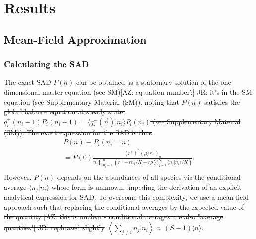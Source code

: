 \documentclass[9pt,twocolumn,twoside,lineno]{pnas-new}
\begin{document}
\section{Results}

\subsection{Mean-Field Approximation}
\subsubsection{Calculating the SAD}
The exact SAD $P(n)$ can be obtained as a stationary solution of the one-dimensional master equation (see SM)\st{[AZ: eq uation number?] JR: it's in the SM equation (see Supplementary Material (SM)). noting that $P(n)$ satisfies the global balance equation at steady state: $ q_i^+(n_i-1) P_i(n_i-1) = \langle q_i^-(\vec{n})|n_i\rangle P_i(n_i) $ (see Supplementary Material (SM)).
The exact expression for the SAD is thus}
\begin{multline}
   P(n) \equiv P_i(n_i=n)\\
   =P(0)\frac{(r^+)^{n}(\mu/r^+)_{n}}{n!\prod_{n_i=1}^{n}\left(r^-+r n_i/K+r\rho \sum_{j\neq i}^S\langle n_j |n_i \rangle /K\right)}.\\
   \label{eq:mean-field}
\end{multline}
However, $P(n)$ depends on the abundances of all species via the conditional average $\langle n_j |n_i\rangle$ whose form is unknown, impeding the derivation of an explicit analytical expression for SAD. 
To overcome this complexity, %
we use a mean-field approach such that \st{replacing the conditional averages by the expected value of the quantity [AZ: this is unclear - conditional averages are also "average quantiies"] JR: rephrased slightly}
$\left\langle \sum_{j\neq i} n_j |n_i\right\rangle\approx  (S-1) \langle n \rangle$. %
\end{document}
